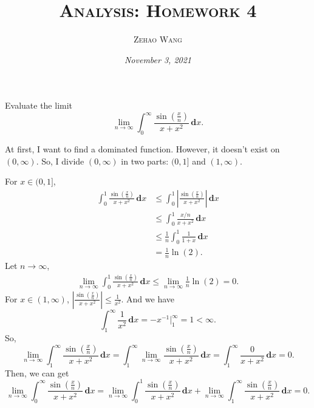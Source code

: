 \documentclass[12pt]{article}
\title{\textsc{Analysis: Homework 4}}
\author{\textsc{Zehao Wang}}
\date{\emph{November 3, 2021}}
\newcounter{problem}
\newenvironment{exercise}{\begin{tcolorbox}[colback=black!15, colframe=black!80, breakable, title=\refstepcounter{problem}\theproblem]}{\end{tcolorbox}}
\newenvironment{solution}{\begin{tcolorbox}[colback=white, colframe=black!50, breakable, title=Solution. ]\setlength{\parskip}{0.8em}}{\end{tcolorbox}}
\newcommand{\der}{\,\mathbf{d}}
\begin{document}
    \maketitle

    \begin{exercise}
        Evaluate the limit
        \[
            \lim_{n\to \infty}\int_0^\infty\frac{\sin\left(\frac{x}{n}\right)}{x+x^2}\der x. 
        \]
    \end{exercise}

    \begin{solution}
        At first, I want to find a dominated function. However, it doesn't exist on $(0,\infty)$. So, I divide $(0,\infty)$ in two parts: $(0,1]$ and $(1,\infty)$. 

        For $x\in (0,1]$, 
        \[
            \begin{aligned}
                \int_0^1\frac{\sin\left(\frac{x}{n}\right)}{x+x^2}\der x & \leqslant\int_0^1\left|\frac{\sin\left(\frac{x}{n}\right)}{x+x^2}\right|\der x\\
                & \leqslant\int_0^1\frac{x/n}{x+x^2}\der x\\
                & \leqslant\frac{1}{n}\int_0^1\frac{1}{1+x}\der x\\
                & =\frac{1}{n}\ln(2). 
            \end{aligned}
        \]
        Let $n\to\infty$, 
        \[
            \begin{aligned}
                \lim_{n\to\infty}\int_0^1\frac{\sin\left(\frac{x}{n}\right)}{x+x^2}\der x \leqslant\lim_{n\to\infty}\frac{1}{n}\ln(2)=0. 
            \end{aligned}
        \]
        For $x\in(1,\infty)$, $\left|\frac{\sin\left(\frac{x}{n}\right)}{x+x^2}\right|\leqslant\frac{1}{x^2}$. And we have
        \[
            \int_1^\infty\frac{1}{x^2}\der x=-x^{-1}\big|_1^\infty=1<\infty. 
        \]
        So, 
        \[
            \lim_{n\to\infty}\int_1^\infty\frac{\sin\left(\frac{x}{n}\right)}{x+x^2}\der x =\int_1^\infty\lim_{n\to\infty}\frac{\sin\left(\frac{x}{n}\right)}{x+x^2}\der x=\int_1^\infty\frac{0}{x+x^2}\der x=0. 
        \]
        Then, we can get
        \[
            \lim_{n\to \infty}\int_0^\infty\frac{\sin\left(\frac{x}{n}\right)}{x+x^2}\der x=\lim_{n\to \infty}\int_0^1\frac{\sin\left(\frac{x}{n}\right)}{x+x^2}\der x+\lim_{n\to \infty}\int_1^\infty\frac{\sin\left(\frac{x}{n}\right)}{x+x^2}\der x=0. 
        \]
    \end{solution}
\end{document}
